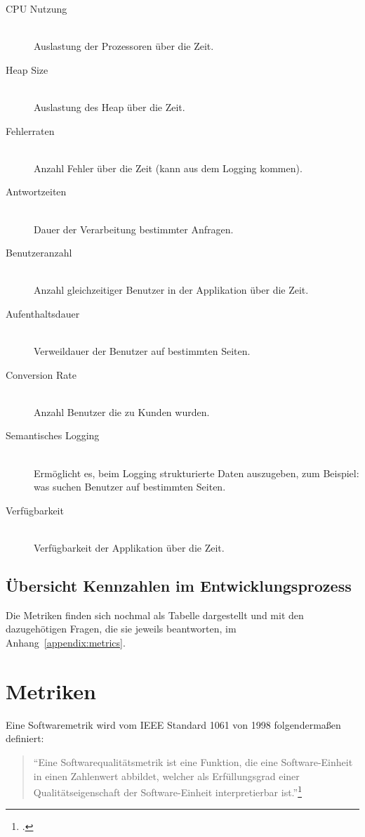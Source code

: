 \begin{description}
  \item[CPU Nutzung] \hfill \\ Auslastung der Prozessoren über die Zeit.
  \item[Heap Size] \hfill \\ Auslastung des Heap über die Zeit.
  \item[Fehlerraten] \hfill \\ Anzahl Fehler über die Zeit (kann aus dem Logging kommen).
  \item[Antwortzeiten] \hfill \\ Dauer der Verarbeitung bestimmter Anfragen.
  \item[Benutzeranzahl] \hfill \\ Anzahl gleichzeitiger Benutzer in der Applikation über die Zeit.
  \item[Aufenthaltsdauer] \hfill \\ Verweildauer der Benutzer auf bestimmten Seiten.
  \item[Conversion Rate] \hfill \\ Anzahl Benutzer die zu Kunden wurden.
  \item[Semantisches Logging] \hfill \\ Ermöglicht es, beim Logging strukturierte Daten auszugeben, zum Beispiel: was suchen Benutzer auf bestimmten Seiten.
  \item[Verfügbarkeit] \hfill \\ Verfügbarkeit der Applikation über die Zeit.
\end{description}

\subsection{Übersicht Kennzahlen im Entwicklungsprozess}

Die Metriken finden sich nochmal als Tabelle dargestellt und mit den dazugehötigen Fragen, die sie jeweils beantworten, im Anhang~\ref{appendix:metrics}.

\newpage
\section{Metriken}

Eine Softwaremetrik wird vom \ac{IEEE} Standard 1061 von 1998 folgendermaßen definiert:
\begin{quote}
  ``Eine Softwarequalitätsmetrik ist eine Funktion, die eine Software-Einheit in einen Zahlenwert abbildet, welcher als Erfüllungsgrad einer Qualitätseigenschaft der Software-Einheit interpretierbar ist.''\footcite[vgl.][S.3]{ieee-1061}
\end{quote}

